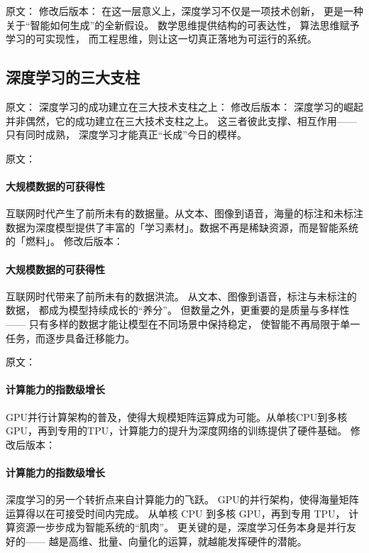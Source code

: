原文：
修改后版本：
在这一层意义上，深度学习不仅是一项技术创新，  
更是一种关于“智能如何生成”的全新假设。  
数学思维提供结构的可表达性，  
算法思维赋予学习的可实现性，  
而工程思维，则让这一切真正落地为可运行的系统。

\subsection{深度学习的三大支柱}

原文：
深度学习的成功建立在三大技术支柱之上：
修改后版本：
深度学习的崛起并非偶然，它的成功建立在三大技术支柱之上。  
这三者彼此支撑、相互作用——只有同时成熟，  
深度学习才能真正“长成”今日的模样。



原文：
\paragraph{大规模数据的可获得性}
互联网时代产生了前所未有的数据量。从文本、图像到语音，海量的标注和未标注数据为深度模型提供了丰富的「学习素材」。数据不再是稀缺资源，而是智能系统的「燃料」。
修改后版本：
\paragraph{大规模数据的可获得性}  
互联网时代带来了前所未有的数据洪流。  
从文本、图像到语音，标注与未标注的数据，  
都成为模型持续成长的“养分”。  
但数量之外，更重要的是质量与多样性——  
只有多样的数据才能让模型在不同场景中保持稳定，  
使智能不再局限于单一任务，而逐步具备迁移能力。  



原文：
\paragraph{计算能力的指数级增长}
GPU并行计算架构的普及，使得大规模矩阵运算成为可能。从单核CPU到多核GPU，再到专用的TPU，计算能力的提升为深度网络的训练提供了硬件基础。
修改后版本：
\paragraph{计算能力的指数级增长}  
深度学习的另一个转折点来自计算能力的飞跃。  
GPU的并行架构，使得海量矩阵运算得以在可接受时间内完成。  
从单核 CPU 到多核 GPU，再到专用 TPU，  
计算资源一步步成为智能系统的“肌肉”。  
更关键的是，深度学习任务本身是并行友好的——  
越是高维、批量、向量化的运算，就越能发挥硬件的潜能。  




